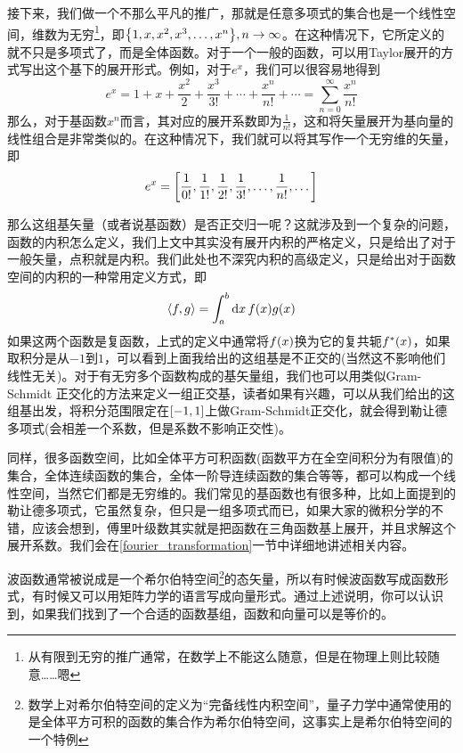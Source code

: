 \documentclass[12pt,a4paper,openany,twoside]{book}
\numberwithin{equation}{section}
\newcommand{\mean}[1]{\left\langle #1 \right\rangle}
\begin{document}
          接下来，我们做一个不那么平凡的推广，那就是任意多项式的集合也是一个线性空间，维数为无穷\footnote{从有限到无穷的推广通常，在数学上不能这么随意，但是在物理上则比较随意……嗯}，即$\qty{1,x,x^2,x^3,\dots,x^n}, n\rightarrow\infty$。在这种情况下，它所定义的就不只是多项式了，而是全体函数。对于一个一般的函数，可以用Taylor展开的方式写出这个基下的展开形式。例如，对于$e^x$，我们可以很容易地得到
          \begin{equation}
            e^x=1+x+\frac{x^2}{2}+\frac{x^3}{3!}+\cdots+\frac{x^n}{n!}+\cdots=\sum_{n=0}^\infty{\frac{x^n}{n!}}
          \end{equation}
          那么，对于基函数$x^n$而言，其对应的展开系数即为$\frac{1}{n!}$，这和将矢量展开为基向量的线性组合是非常类似的。在这种情况下，我们就可以将其写作一个无穷维的矢量，即
          \begin{equation}
            e^x=\qty[\frac{1}{0!},\frac{1}{1!},\frac{1}{2!},\frac{1}{3!},\dots,\frac{1}{n!},\dots]
          \end{equation}

          那么这组基矢量（或者说基函数）是否正交归一呢？这就涉及到一个复杂的问题，函数的内积怎么定义，我们上文中其实没有展开内积的严格定义，只是给出了对于一般矢量，点积就是内积。我们此处也不深究内积的高级定义，只是给出对于函数空间的内积的一种常用定义方式，即
          \begin{equation}
            \mean{f,g}=\int_a^b{\dd{x} f\qty(x)g\qty(x)}
          \end{equation}
          如果这两个函数是复函数，上式的定义中通常将$f\qty(x)$换为它的复共轭$f^*\qty(x)$，如果取积分是从$-1$到$1$，可以看到上面我给出的这组基是不正交的(当然这不影响他们线性无关)。对于有无穷多个函数构成的基矢量组，我们也可以用类似Gram-Schmidt 正交化的方法来定义一组正交基，读者如果有兴趣，可以从我们给出的这组基出发，将积分范围限定在$\qty[-1,1]$上做Gram-Schmidt正交化，就会得到勒让德多项式(会相差一个系数，但是系数不影响正交性)。

          同样，很多函数空间，比如全体平方可积函数(函数平方在全空间积分为有限值)的集合，全体连续函数的集合，全体一阶导连续函数的集合等等，都可以构成一个线性空间，当然它们都是无穷维的。我们常见的基函数也有很多种，比如上面提到的勒让德多项式，它虽然复杂，但只是一组多项式而已，如果大家的微积分学的不错，应该会想到，傅里叶级数其实就是把函数在三角函数基上展开，并且求解这个展开系数。我们会在\ref{fourier_transformation}一节中详细地讲述相关内容。
          
          波函数通常被说成是一个希尔伯特空间\footnote{数学上对希尔伯特空间的定义为“完备线性内积空间”，量子力学中通常使用的是全体平方可积的函数的集合作为希尔伯特空间，这事实上是希尔伯特空间的一个特例}的态矢量，所以有时候波函数写成函数形式，有时候又可以用矩阵力学的语言写成向量形式。通过上述说明，你可以认识到，如果我们找到了一个合适的函数基组，函数和向量可以是等价的。
    
\end{document}
